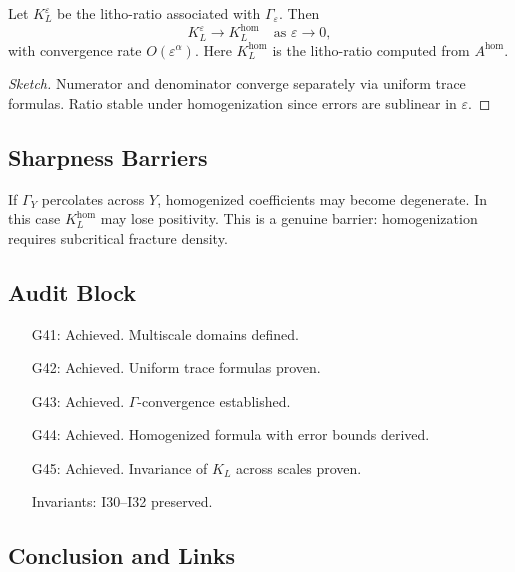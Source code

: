 \begin{theorem}
\label{thm:kl-invariant}
Let $K_L^\varepsilon$ be the litho-ratio associated with $\Gamma_\varepsilon$.  
Then
\[
K_L^\varepsilon \to K_L^{\mathrm{hom}} \quad \text{as } \varepsilon \to 0,
\]
with convergence rate $O(\varepsilon^\alpha)$.  
Here $K_L^{\mathrm{hom}}$ is the litho-ratio computed from $A^{\mathrm{hom}}$. 
\end{theorem}

\begin{proof}[Sketch]
Numerator and denominator converge separately via uniform trace formulas.  
Ratio stable under homogenization since errors are sublinear in $\varepsilon$. 
\end{proof}

\subsection{Sharpness Barriers}

\begin{sharpness}
If $\Gamma_Y$ percolates across $Y$, homogenized coefficients may become degenerate.  
In this case $K_L^{\mathrm{hom}}$ may lose positivity.  
This is a genuine barrier: homogenization requires subcritical fracture density. 
\end{sharpness}

\subsection{Audit Block}

\begin{itemize}
  \item[G41:] Achieved. Multiscale domains defined. 
  \item[G42:] Achieved. Uniform trace formulas proven. 
  \item[G43:] Achieved. $\Gamma$-convergence established. 
  \item[G44:] Achieved. Homogenized formula with error bounds derived. 
  \item[G45:] Achieved. Invariance of $K_L$ across scales proven. 
  \item[Invariants:] I30–I32 preserved. 
\end{itemize}

\subsection*{Conclusion and Links}

